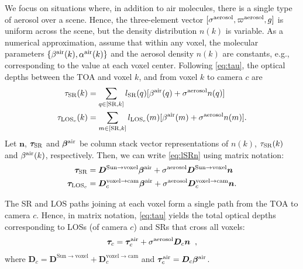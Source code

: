 \documentclass[10pt,letterpaper]{article}
\newcommand{\vect}[1]{\bm{#1}}
\newcommand{\OpDistance}{\bm{D}}
\newcommand{\DistUnknown}{\vect{n}}
\begin{document}
We focus on situations where, in addition to air molecules, there is a
single type of aerosol over a scene. Hence, the three-element vector
$[{\sigma}^{\rm aerosol},\varpi^{\rm aerosol},g]$ is uniform across
the scene, but the density distribution $n(k)$ is
variable. As a numerical approximation, assume that within any voxel,
the molecular parameters $\{ \beta^{\rm air}(k),\alpha^{\rm air}(k)\}$
and the aerosol density $n(k)$ are constants, e.g., corresponding to
the value at each voxel center.  Following \cref{eq:tau}, the optical
depths between the TOA and voxel $k$, and from voxel $k$ to camera $c$
are
\begin{align}
  \tau_{\rm SR}(k)&= \sum_{q \in[{\rm SR},k]} l_{\rm SR}(q)
  [\beta^{\rm air}(q)+\sigma^{\rm aerosol} n(q)] \nonumber \\
  \tau_{{\rm LOS}_c}(k)&= \sum_{m \in[{\rm SR},k]} l_{{\rm LOS}_c}(m)
  [\beta^{\rm air}(m)+\sigma^{\rm aerosol} n(m)].
  \label{eq:lSRn}
\end{align}
Let ${\DistUnknown}$, $\vect{\tau}_{\rm SR}$ and $\vect{\beta}^{\rm air}$ be column
stack vector representations of $n(k)$, $\tau_{\rm SR}(k)$ and $\beta^{\rm
  air}(k)$, respectively.  Then, we can write \cref{eq:lSRn} using
matrix notation:
\begin{align}
  \vect{\tau}_{\rm SR} &= \OpDistance^{\mathrm{Sun
      \rightarrow voxel}}\vect{\beta}^{\rm air} + \sigma^{\rm
    aerosol}\OpDistance^{\mathrm{Sun \rightarrow voxel}}
  {\DistUnknown} \nonumber \\
  \vect{\tau}_{{\rm LOS}_c} &=
  \OpDistance_c^{\mathrm{voxel \rightarrow cam}}\vect{\beta}^{\rm air} +
  \sigma^{\rm aerosol}\OpDistance_c^{\mathrm{voxel \rightarrow cam}}
  {\DistUnknown}.
\end{align}

The SR and LOS paths joining at each voxel form a
single path from the TOA to camera $c$.  Hence, in matrix notation,
\cref{eq:tau} yields the total optical depths corresponding to LOSs
(of camera $c$) and SRs that cross all voxels:
\begin{equation}
  \vect{\tau}_c= \vect{\tau}_c^{\rm air}
  + \sigma^{\rm aerosol} {\bm D}_c {\bm n}
  \;\;,
  \label{eq:tautotal}
\end{equation}
where ${\bm D}_c= {\bm D}^{\mathrm{Sun \rightarrow voxel}}+ {\bm
  D}^{\mathrm{voxel \rightarrow cam}}_c$ and $\vect{\tau}_c^{\rm air}=
{\bm D}_c \vect{\beta}^{\rm air}$.

\end{document}
